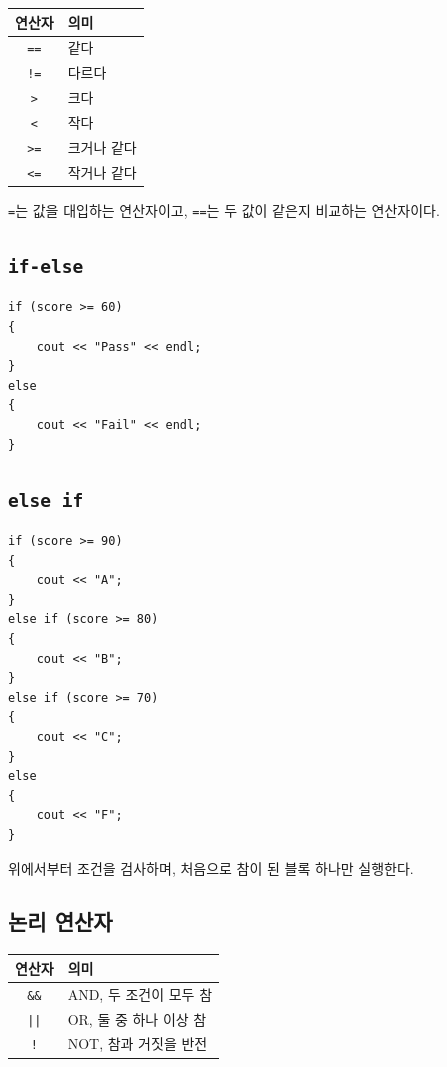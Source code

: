 \documentclass[11pt,a4paper]{article}
\begin{document}
\begin{center}
\begin{tabular}{cl}
\toprule
연산자 & 의미 \\
\midrule
\texttt{==} & 같다 \\
\texttt{!=} & 다르다 \\
\texttt{>} & 크다 \\
\texttt{<} & 작다 \\
\texttt{>=} & 크거나 같다 \\
\texttt{<=} & 작거나 같다 \\
\bottomrule
\end{tabular}
\end{center}

\begin{importantbox}
\texttt{=}는 값을 대입하는 연산자이고, \texttt{==}는 두 값이 같은지 비교하는 연산자이다.
\end{importantbox}

\subsection{\texttt{if-else}}

\begin{lstlisting}
if (score >= 60)
{
    cout << "Pass" << endl;
}
else
{
    cout << "Fail" << endl;
}
\end{lstlisting}

\subsection{\texttt{else if}}

\begin{lstlisting}
if (score >= 90)
{
    cout << "A";
}
else if (score >= 80)
{
    cout << "B";
}
else if (score >= 70)
{
    cout << "C";
}
else
{
    cout << "F";
}
\end{lstlisting}

위에서부터 조건을 검사하며, 처음으로 참이 된 블록 하나만 실행한다.

\subsection{논리 연산자}

\begin{center}
\begin{tabular}{cl}
\toprule
연산자 & 의미 \\
\midrule
\texttt{\&\&} & AND, 두 조건이 모두 참 \\
\texttt{||} & OR, 둘 중 하나 이상 참 \\
\texttt{!} & NOT, 참과 거짓을 반전 \\
\bottomrule
\end{tabular}
\end{center}
\end{document}
